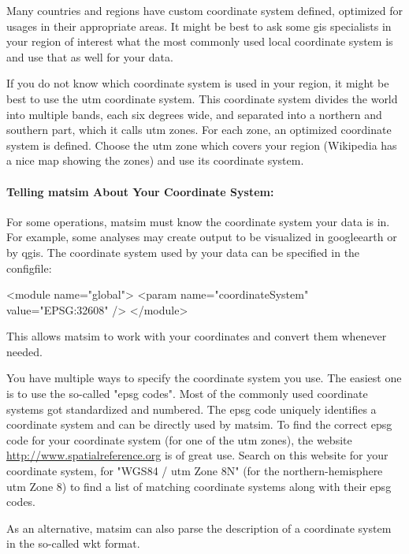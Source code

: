 Many countries and regions have custom coordinate system defined, optimized for usages in their appropriate areas. It might be best to ask some \gls{gis} specialists in your region of interest what the most commonly used local coordinate system is and use that as well for your data.

If you do not
know which coordinate system is used in your region, it might be best to use the \gls{utm} coordinate system. This coordinate system divides the world into multiple bands, each six degrees wide, and separated into a northern and southern part, which it calls \gls{utm} zones. For each zone, an optimized coordinate system is defined. Choose the \gls{utm} zone which covers your region (Wikipedia has a nice map showing the zones) and use its coordinate system. 

\paragraph{Telling \protect\gls{matsim} About Your Coordinate System:}

For some operations, \gls{matsim} must know the coordinate system your data is in. For example, some analyses may create output to be visualized in \gls{googleearth} or by \gls{qgis}.
The coordinate system used by your data can be specified in the \gls{configfile}:
\begin{xml}
<module name="global"> 
  <param name="coordinateSystem" value="EPSG:32608" /> 
</module>
\end{xml}
This allows \gls{matsim} to work with your coordinates and convert them whenever needed. 

You have multiple ways to specify the coordinate system you use. The easiest one is to use the so-called "\gls{epsg} codes". Most of the commonly used coordinate systems got standardized and numbered. The \gls{epsg} code uniquely identifies a coordinate system and can be directly used by \gls{matsim}. To find the correct \gls{epsg} code for your coordinate system (\eg for one of the \gls{utm} zones), the website \url{http://www.spatialreference.org} is of great use. Search on this website for your coordinate system, \eg for "WGS84 / \gls{utm} Zone 8N" (for the northern-hemisphere \gls{utm} Zone 8) to find a list of matching coordinate systems along with their \gls{epsg} codes.

As an alternative, \gls{matsim} can also parse the description of a coordinate system in the so-called \gls{wkt} format. 

